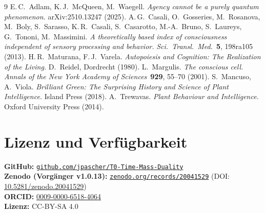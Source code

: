 \begin{thebibliography}{9}
 E.\,C.~Adlam, K.\,J.~McQueen, M.~Waegell. \emph{Agency cannot be a purely quantum phenomenon.} arXiv:2510.13247 (2025).
 A.\,G.~Casali, O.~Gosseries, M.~Rosanova, M.~Boly, S.~Sarasso, K.\,R.~Casali, S.~Casarotto, M.-A.~Bruno, S.~Laureys, G.~Tononi, M.~Massimini. \emph{A theoretically based index of consciousness independent of sensory processing and behavior.} \emph{Sci.\ Transl.\ Med.}\ \textbf{5}, 198ra105 (2013).
 H.\,R.~Maturana, F.\,J.~Varela. \emph{Autopoiesis and Cognition: The Realization of the Living.} D.~Reidel, Dordrecht (1980).
 L.~Margulis. \emph{The conscious cell.} \emph{Annals of the New York Academy of Sciences}\ \textbf{929}, 55--70 (2001).
 S.~Mancuso, A.~Viola. \emph{Brilliant Green: The Surprising History and Science of Plant Intelligence.} Island Press (2018).
 A.~Trewavas. \emph{Plant Behaviour and Intelligence.} Oxford University Press (2014).
\end{thebibliography}

\section*{Lizenz und Verfügbarkeit}

\textbf{GitHub:} \href{https://github.com/jpascher/T0-Time-Mass-Duality}{\texttt{github.com/jpascher/T0-Time-Mass-Duality}}\\
\textbf{Zenodo (Vorgänger v1.0.13):} \href{https://zenodo.org/records/20041529}{\texttt{zenodo.org/records/20041529}} (DOI: \href{https://doi.org/10.5281/zenodo.20041529}{10.5281/zenodo.20041529})\\
\textbf{ORCID:} \href{https://orcid.org/0009-0000-6518-4064}{0009-0000-6518-4064}\\
\textbf{Lizenz:} CC-BY-SA 4.0
